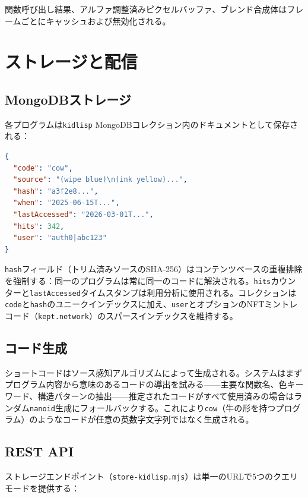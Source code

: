 \documentclass[10pt,letterpaper,twocolumn]{article}
\begin{document}
関数呼び出し結果、アルファ調整済みピクセルバッファ、ブレンド合成体はフレームごとにキャッシュおよび無効化される。

\section{ストレージと配信}
\label{sec:infrastructure}

\subsection{MongoDBストレージ}

各プログラムは\texttt{kidlisp} MongoDBコレクション内のドキュメントとして保存される：

\begin{lstlisting}[language=json]
{
  "code": "cow",
  "source": "(wipe blue)\n(ink yellow)...",
  "hash": "a3f2e8...",
  "when": "2025-06-15T...",
  "lastAccessed": "2026-03-01T...",
  "hits": 342,
  "user": "auth0|abc123"
}
\end{lstlisting}

\texttt{hash}フィールド（トリム済みソースのSHA-256）はコンテンツベースの重複排除を強制する：同一のプログラムは常に同一のコードに解決される。\texttt{hits}カウンターと\texttt{lastAccessed}タイムスタンプは利用分析に使用される。コレクションは\texttt{code}と\texttt{hash}のユニークインデックスに加え、\texttt{user}とオプションのNFTミントレコード（\texttt{kept.network}）のスパースインデックスを維持する。

\subsection{コード生成}

ショートコードはソース感知アルゴリズムによって生成される。システムはまずプログラム内容から意味のあるコードの導出を試みる——主要な関数名、色キーワード、構造パターンの抽出——推定されたコードがすべて使用済みの場合はランダム\texttt{nanoid}生成にフォールバックする。これにより\texttt{cow}（牛の形を持つプログラム）のようなコードが任意の英数字文字列ではなく生成される。

\subsection{REST API}

ストレージエンドポイント（\texttt{store-kidlisp.mjs}）は単一のURLで5つのクエリモードを提供する：
\end{document}
